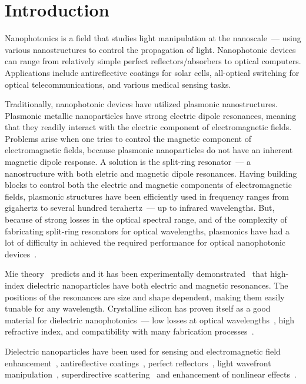 \section*{Introduction}
\label{ch:Intro}
        Nanophotonics is a field that studies light manipulation at the nanoscale~--- using various nanostructures to control the
    propagation of light. Nanophotonic devices can range from relatively simple perfect reflectors/absorbers to optical computers.
    Applications include antireflective coatings for solar cells, all-optical switching for optical telecommunications, and various
    medical sensing tasks.

        Traditionally, nanophotonic devices have utilized plasmonic nanostructures. Plasmonic metallic nanoparticles have strong
    electric dipole resonances, meaning that they readily interact with the electric component of electromagnetic fields. Problems arise
    when one tries to control the magnetic component of electromagnetic fields, because plasmonic nanoparticles do not have an inherent
    magnetic dipole response. A solution is the split-ring resonator~--- a nanostructure with both eletric and magnetic dipole resonances.
    Having building blocks to control both the electric and magnetic components of electromagnetic fields, plasmonic structures have been efficiently
    used in frequency ranges from gigahertz to several hundred terahertz~--- up to infrared wavelengths. But, because of strong losses
    in the optical spectral range, and of the complexity of fabricating split-ring resonators for optical wavelengths, plasmonics have
    had a lot of difficulty in achieved the required performance for optical nanophotonic devices~\cite{krasnok2015towards}.

        Mie theory~\cite{mie1908beitrage} predicts and it has been experimentally demonstrated~\cite{kuznetsov2012magnetic} that
        high-index dielectric nanoparticles have both electric and
    magnetic resonances. The positions of the resonances are size and shape dependent, making them easily tunable for any wavelength.
    Crystalline silicon has proven itself as a good material for dielectric nanophotonics~--- low losses at optical wavelengths~\cite{palik1998handbook},
    high refractive index, and compatibility with many fabrication processes~\cite{popa2008compact,zhao2009mie,evlyukhin2010optical,garcia2011strong,
    krasnok2012all,ginn2012realizing,fu2012directional,krasnok2015towards}.

        Dielectric nanoparticles have been used for sensing and electromagnetic field enhancement~\cite{albella2013low,zambrana2015purcell,
    bakker2015magnetic,caldarola2015non}, antireflective coatings~\cite{spinelli2012broadband},  perfect reflectors~\cite{evlyukhin2010optical,
    moitra2014experimental}, light wavefront manipulation~\cite{decker2015high,yu2015high}, superdirective scattering~\cite{krasnok2014superdirective,
    krasnok2014experimental} and enhancement of nonlinear effects~\cite{shcherbakov2014enhanced,makarov2015tuning}.

\clearpage

